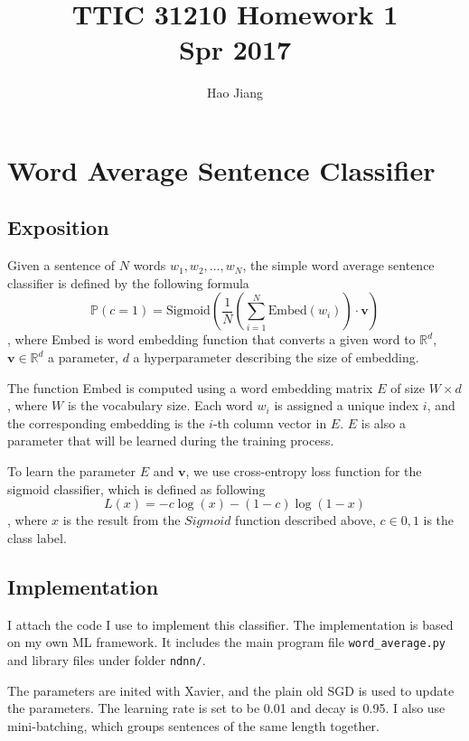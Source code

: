 \documentclass{article}
\title{TTIC 31210 Homework 1 \\ Spr 2017}
\author{Hao Jiang}
\begin{document}
\maketitle

\section{Word Average Sentence Classifier}
\subsection{Exposition}
Given a sentence of $N$ words $w_1, w_2,\ldots,w_N$, the simple word average sentence classifier is defined by the following formula
\[
\mathbb{P}(c=1) = \text{Sigmoid}(\frac{1}{N}(\sum_{i=1}^N \text{Embed}(w_i))\cdot \textbf{v})
\],
where Embed is word embedding function that converts a given word to $\mathbb{R}^d$, $\textbf{v}\in \mathbb{R}^d$ a parameter, $d$ a hyperparameter describing the size of embedding.

The function Embed is computed using a word embedding matrix $E$ of size $W\times d$, where $W$ is the vocabulary size. Each word $w_i$ is assigned a unique index $i$, and the corresponding embedding is the $i$-th column vector in $E$. $E$ is also a parameter that will be learned during the training process.

To learn the parameter $E$ and $\textbf{v}$, we use cross-entropy loss function for the sigmoid classifier, which is defined as following
\[
L(x) = - c\log(x) - (1-c)\log(1-x)
\], where $x$ is the result from the $Sigmoid$ function described above, $c\in {0,1}$ is the class label.
\subsection{Implementation}
I attach the code I use to implement this classifier. The implementation is based on my own ML framework. It includes the main program file \texttt{word\_average.py} and library files under folder \texttt{ndnn/}.

The parameters are inited with Xavier, and the plain old SGD is used to update the parameters. The learning rate is set to be 0.01 and decay is 0.95. I also use mini-batching, which groups sentences of the same length together.
\end{document}
